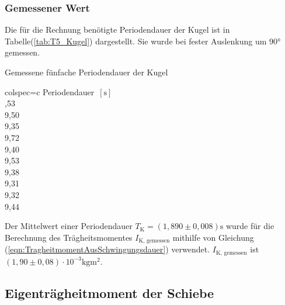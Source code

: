    \subsubsection{Gemessener Wert}
    Die für die Rechnung benötigte Periodendauer der Kugel ist in Tabelle(\ref{tab:T5_Kugel}) dargestellt. 
    Sie wurde bei fester Auslenkung um 90° gemessen.
    \begin{table}[H]
      \centering 
      \caption{Gemessene fünfache Periodendauer der Kugel}
      \label{tab:T5_Kugel}
      \begin{tblr}{colspec={c}}
          \toprule
          Periodendauer $\,[\unit{\second}]$ \\
          ,53 \\
          9,50 \\
          9,35 \\
          9,72 \\
          9,40 \\
          9,53 \\
          9,38 \\
          9,31 \\
          9,32 \\
          9,44 \\
          \bottomrule
      \end{tblr}
    \end{table}
    Der Mittelwert einer Periodendauer $T_{\text{K}} = (1,890 \pm 0,008) \unit{\second}$ wurde für die Berechnung des 
    Trägheitsmomentes $I_{\text{K, gemessen}}$ mithilfe von Gleichung (\ref{eqn:TragheitmomentAusSchwingungsdauer}) verwendet. 
    $I_{\text{K, gemessen}}$ ist $(1,90 \pm 0,08) \cdot 10^{-3} \unit{\kilo\gram\meter\squared}$.

  \subsection{Eigenträgheitmoment der Schiebe}
